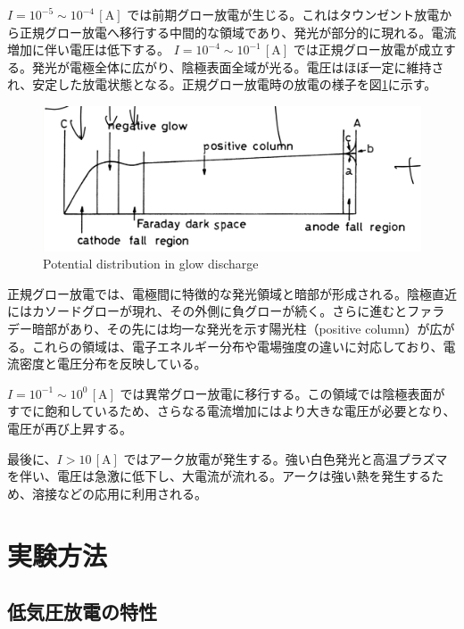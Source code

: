 \documentclass[dvipdfmx]{jsarticle}
\begin{document}
$I = 10^{-5} \sim 10^{-4}\,\mathrm{[A]}$ では前期グロー放電が生じる。これはタウンゼント放電から正規グロー放電へ移行する中間的な領域であり、発光が部分的に現れる。電流増加に伴い電圧は低下する。
$I = 10^{-4} \sim 10^{-1}\,\mathrm{[A]}$ では正規グロー放電が成立する。発光が電極全体に広がり、陰極表面全域が光る。電圧はほぼ一定に維持され、安定した放電状態となる。正規グロー放電時の放電の様子を図\ref{fig:2}に示す。

\begin{figure}[H]
 \centering
 \includegraphics[scale=0.4]{assets/glow-discharge.png}
 \caption{Potential distribution in glow discharge}
 \label{fig:2}
\end{figure}

正規グロー放電では、電極間に特徴的な発光領域と暗部が形成される。陰極直近にはカソードグローが現れ、その外側に負グローが続く。さらに進むとファラデー暗部があり、その先には均一な発光を示す陽光柱（positive column）が広がる。これらの領域は、電子エネルギー分布や電場強度の違いに対応しており、電流密度と電圧分布を反映している。


$I = 10^{-1} \sim 10^{0}\,\mathrm{[A]}$ では異常グロー放電に移行する。この領域では陰極表面がすでに飽和しているため、さらなる電流増加にはより大きな電圧が必要となり、電圧が再び上昇する。

最後に、$I > 10\,\mathrm{[A]}$ ではアーク放電が発生する。強い白色発光と高温プラズマを伴い、電圧は急激に低下し、大電流が流れる。アークは強い熱を発生するため、溶接などの応用に利用される。
\section{実験方法}
    \subsection{低気圧放電の特性}
\end{document}
